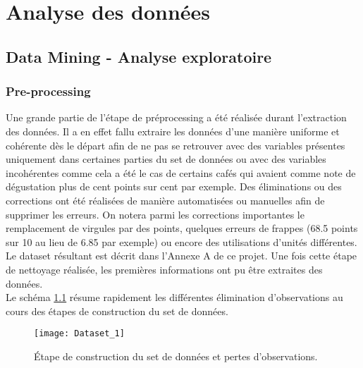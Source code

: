 \chapter{Analyse des données}


\section{Data Mining - Analyse exploratoire}

\subsection{Pre-processing}



Une grande partie de l'étape de préprocessing a été réalisée durant l'extraction des données. Il a en effet fallu extraire les données d'une manière uniforme et cohérente dès le départ afin de ne pas se retrouver avec des variables présentes uniquement dans certaines parties du set de données ou avec des variables incohérentes comme cela a été le cas de certains cafés qui avaient comme note de dégustation plus de cent points sur cent par exemple. Des éliminations ou des corrections ont été réalisées de manière automatisées ou manuelles afin de supprimer les erreurs. On notera parmi les corrections importantes le remplacement de virgules par des points, quelques erreurs de frappes (68.5 points sur 10 au lieu de 6.85 par exemple) ou encore des utilisations d'unités différentes. Le dataset résultant est décrit dans l'Annexe A de ce projet. Une fois cette étape de nettoyage réalisée, les premières informations ont pu être extraites des données.\\


\noindent Le schéma \ref{DatasetMaking} résume rapidement les différentes élimination d'observations au cours des étapes de construction du set de données. 

\begin{figure}[H]
	\texttt{[image: Dataset\_1]}
	\caption{\label{DatasetMaking} Étape de construction du set de données et pertes d'observations.}
\end{figure}


